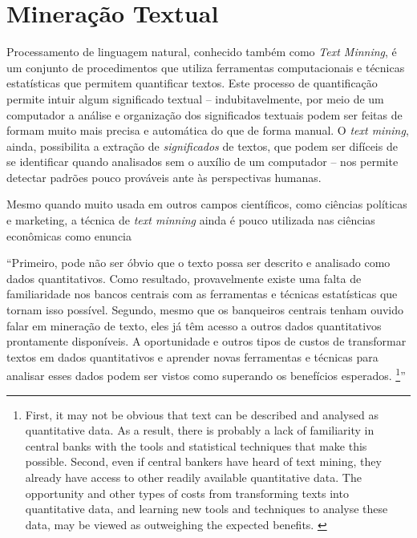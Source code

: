 \section{Mineração Textual}

Processamento de linguagem natural, conhecido também como \textit{Text Minning}, é um conjunto de procedimentos que utiliza ferramentas computacionais e técnicas estatísticas que permitem quantificar textos. Este processo de quantificação permite intuir algum significado textual -- indubitavelmente, por meio de um computador a análise e organização dos significados textuais podem ser feitas de formam muito mais precisa e automática do que de forma manual. O \textit{text mining}, ainda, possibilita a extração de \textit{significados} de textos, que podem ser difíceis de se identificar quando analisados sem o auxílio de um computador -- nos permite detectar padrões pouco prováveis ante às perspectivas humanas.

Mesmo quando muito usada em outros campos científicos, como ciências políticas e marketing, a técnica de \textit{text minning} ainda é pouco utilizada nas ciências econômicas como enuncia 

\begin{citacao}``Primeiro, pode não ser óbvio que o texto possa ser descrito e analisado como dados quantitativos. Como resultado, provavelmente existe uma falta de familiaridade nos bancos centrais com as ferramentas e técnicas estatísticas que tornam isso possível. Segundo, mesmo que os banqueiros centrais tenham ouvido falar em mineração de texto, eles já têm acesso a outros dados quantitativos prontamente disponíveis. A oportunidade e outros tipos de custos de transformar textos em dados quantitativos e aprender novas ferramentas e técnicas para analisar esses dados podem ser vistos como superando os benefícios esperados.
\footnote{First, it may not be obvious that text can be described and analysed as quantitative data. As a result, there is probably a lack of familiarity in central banks with the tools and statistical techniques that make this possible. Second, even if central bankers have heard of text mining, they already have access to other readily available quantitative data. The opportunity and other types of costs from transforming texts into quantitative data, and learning new tools and techniques to analyse these data, may be viewed as outweighing the expected benefits. \cite[p.1]{bholat2015text}}'' \cite[p.1]{bholat2015text}
\end{citacao}

